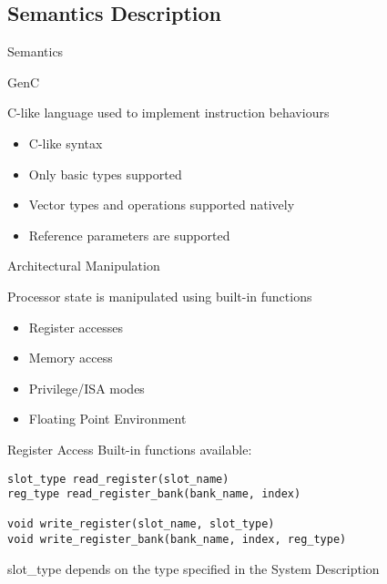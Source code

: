 \subsection{Semantics Description}

\begin{frame}{Semantics}

\end{frame}

\begin{frame}{GenC}

C-like language used to implement instruction behaviours
\begin{itemize}
\item C-like syntax
\item Only basic types supported
\item Vector types and operations supported natively
\item Reference parameters are supported
\end{itemize}

\end{frame}

\begin{frame}{Architectural Manipulation}

Processor state is manipulated using built-in functions
\begin{itemize}
\item Register accesses
\item Memory access
\item Privilege/ISA modes
\item Floating Point Environment
\end{itemize}

\end{frame}

\begin{frame}[fragile]{Register Access}
Built-in functions available:
\begin{lstlisting}
slot_type read_register(slot_name)
reg_type read_register_bank(bank_name, index)

void write_register(slot_name, slot_type)
void write_register_bank(bank_name, index, reg_type)
\end{lstlisting}

slot\_type depends on the type specified in the System Description

\end{frame}

